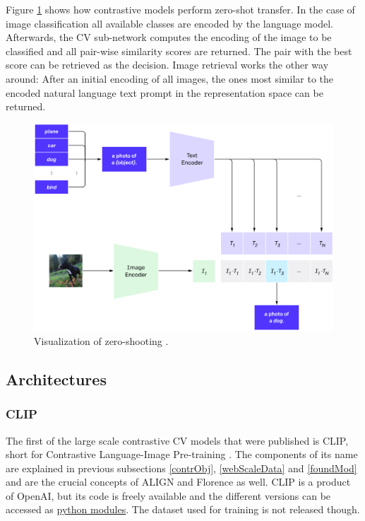 \documentclass[
]{krantz}
\begin{document}
Figure \ref{fig:zero-shooting} shows how contrastive models perform zero-shot transfer.
In the case of image classification all available classes are encoded by the language model.
Afterwards, the CV sub-network computes the encoding of the image to be classified and all pair-wise similarity scores are returned.
The pair with the best score can be retrieved as the decision.
Image retrieval works the other way around:
After an initial encoding of all images, the ones most similar to the encoded natural language text prompt in the representation space can be returned.

\begin{figure}

{\centering \includegraphics[width=1\linewidth]{figures/02-04-text-support-img/zero-shooting} 

}

\caption{Visualization of zero-shooting \citep{radford2021learning}.}\label{fig:zero-shooting}
\end{figure}



\hypertarget{architectures}{%
\subsection{Architectures}\label{architectures}}

\hypertarget{clip}{%
\subsubsection{CLIP}\label{clip}}

The first of the large scale contrastive CV models that were published is CLIP, short for Contrastive Language-Image Pre-training \citep{radford2021learning}.
The components of its name are explained in previous subsections \ref{contrObj}, \ref{webScaleData} and \ref{foundMod} and are the crucial concepts of ALIGN and Florence as well.
CLIP is a product of OpenAI, but its code is freely available and the different versions can be accessed as \href{https://github.com/openai/CLIP}{python modules}.
The dataset used for training is not released though.
\end{document}
